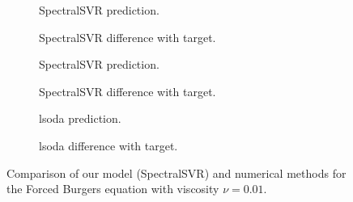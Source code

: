 \begin{figure}[H]
  \centering
  \begin{adjustwidth}{-0.05\linewidth}{-0.05\linewidth}
    \begin{subfigure}{0.49\linewidth}
      \begin{adjustbox}{width=\linewidth}
        
      \end{adjustbox}
      \caption{SpectralSVR prediction.}\label{fig:comp_lssvr_pred_0.01}
    \end{subfigure}
    \begin{subfigure}{0.49\linewidth}
      \begin{adjustbox}{width=\linewidth}
        
      \end{adjustbox}
      \caption{SpectralSVR difference with target.}\label{fig:comp_lssvr_diff_0.01}
    \end{subfigure}
    \begin{subfigure}{0.49\linewidth}
      \begin{adjustbox}{width=\linewidth}
        
      \end{adjustbox}
      \caption{SpectralSVR prediction.}\label{fig:comp_fnn_pred_0.01}
    \end{subfigure}
    \begin{subfigure}{0.49\linewidth}
      \begin{adjustbox}{width=\linewidth}
        
      \end{adjustbox}
      \caption{SpectralSVR difference with target.}\label{fig:comp_fnn_diff_0.01}
    \end{subfigure}
    \begin{subfigure}{0.49\linewidth}
      \begin{adjustbox}{width=\linewidth}
        
      \end{adjustbox}
      \caption{lsoda prediction.}\label{fig:comp_spo_pred_0.01}
    \end{subfigure}
    \begin{subfigure}{0.49\linewidth}
      \begin{adjustbox}{width=\linewidth}
        
      \end{adjustbox}
      \caption{lsoda difference with target.}\label{fig:comp_spo_diff_0.01}
    \end{subfigure}
  \end{adjustwidth}
  \caption{Comparison of our model (SpectralSVR) and numerical methods for the Forced Burgers equation with viscosity \(\nu=0.01\).}\label{fig:comparison_burgers_0.01}
\end{figure}

